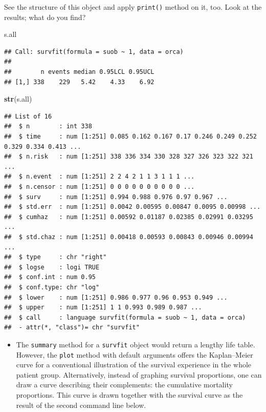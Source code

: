 \documentclass[
]{book}
\newenvironment{Shaded}{\begin{snugshade}}{\end{snugshade}}
\newcommand{\FunctionTok}[1]{\textcolor[rgb]{0.13,0.29,0.53}{\textbf{#1}}}
\newcommand{\NormalTok}[1]{#1}
\providecommand{\tightlist}{%
  \setlength{\itemsep}{0pt}\setlength{\parskip}{0pt}}
\begin{document}
See the structure of this object and apply \texttt{print()} method on it, too.
Look at the results; what do you find?

\begin{Shaded}
\begin{Highlighting}[]
\NormalTok{s.all}
\end{Highlighting}
\end{Shaded}

\begin{verbatim}
## Call: survfit(formula = suob ~ 1, data = orca)
## 
##        n events median 0.95LCL 0.95UCL
## [1,] 338    229   5.42    4.33    6.92
\end{verbatim}

\begin{Shaded}
\begin{Highlighting}[]
\FunctionTok{str}\NormalTok{(s.all)}
\end{Highlighting}
\end{Shaded}

\begin{verbatim}
## List of 16
##  $ n        : int 338
##  $ time     : num [1:251] 0.085 0.162 0.167 0.17 0.246 0.249 0.252 0.329 0.334 0.413 ...
##  $ n.risk   : num [1:251] 338 336 334 330 328 327 326 323 322 321 ...
##  $ n.event  : num [1:251] 2 2 4 2 1 1 3 1 1 1 ...
##  $ n.censor : num [1:251] 0 0 0 0 0 0 0 0 0 0 ...
##  $ surv     : num [1:251] 0.994 0.988 0.976 0.97 0.967 ...
##  $ std.err  : num [1:251] 0.0042 0.00595 0.00847 0.0095 0.00998 ...
##  $ cumhaz   : num [1:251] 0.00592 0.01187 0.02385 0.02991 0.03295 ...
##  $ std.chaz : num [1:251] 0.00418 0.00593 0.00843 0.00946 0.00994 ...
##  $ type     : chr "right"
##  $ logse    : logi TRUE
##  $ conf.int : num 0.95
##  $ conf.type: chr "log"
##  $ lower    : num [1:251] 0.986 0.977 0.96 0.953 0.949 ...
##  $ upper    : num [1:251] 1 1 0.993 0.989 0.987 ...
##  $ call     : language survfit(formula = suob ~ 1, data = orca)
##  - attr(*, "class")= chr "survfit"
\end{verbatim}

\begin{itemize}
\tightlist
\item
  The \texttt{summary} method for
  a \texttt{survfit} object would return a lengthy life table.
  However, the \texttt{plot} method with default
  arguments offers the Kaplan--Meier curve
  for a conventional illustration of the survival experience in the whole patient group.
  Alternatively, instead of graphing survival proportions,
  one can draw a curve describing their complements: the cumulative mortality proportions. This curve is drawn together with the survival curve as the
  result of the second command line below.
\end{itemize}
\end{document}

